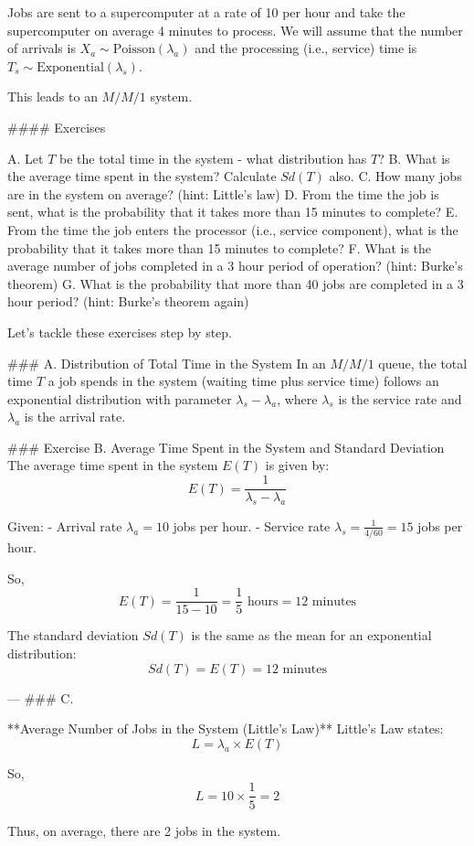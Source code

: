 


Jobs are sent to a supercomputer at a rate of 10 per hour and take the supercomputer on average 4 minutes to process. 
We will assume that the number of arrivals is $X_a \sim \text{Poisson}(\lambda_a)$ and the processing (i.e., service) time is $T_s \sim \text{Exponential}(\lambda_s)$. 

This leads to an $M/M/1$ system.

#### Exercises

A. Let $T$ be the total time in the system - what distribution has $T$? 
B. What is the average time spent in the system? Calculate $Sd(T)$ also.
C. How many jobs are in the system on average? (hint: Little's law)  
D. From the time the job is sent, what is the probability that it takes more than 15 minutes to complete? 
E. From the time the job enters the processor (i.e., service component), what is the probability that it takes more than 15 minutes to complete? 
F. What is the average number of jobs completed in a 3 hour period of operation? (hint: Burke's theorem)
G. What is the probability that more than 40 jobs are completed in a 3 hour period? (hint: Burke's theorem again)


Let's tackle these exercises step by step.

### A. Distribution of Total Time in the System
In an $M/M/1$ queue, the total time $T$ a job spends in the system (waiting time plus service time) follows an exponential distribution with parameter $\lambda_s - \lambda_a$, where $\lambda_s$ is the service rate and $\lambda_a$ is the arrival rate.

### Exercise B. 
Average Time Spent in the System and Standard Deviation
The average time spent in the system $E(T)$ is given by:
$$E(T) = \frac{1}{\lambda_s - \lambda_a}$$

Given:
- Arrival rate $\lambda_a = 10$ jobs per hour.
- Service rate $\lambda_s = \frac{1}{4/60} = 15$ jobs per hour.

So,
$$E(T) = \frac{1}{15 - 10} = \frac{1}{5} \text{ hours} = 12 \text{ minutes}$$

The standard deviation $Sd(T)$ is the same as the mean for an exponential distribution:
$$Sd(T) = E(T) = 12 \text{ minutes}$$

---
### C. 

**Average Number of Jobs in the System (Little's Law)**
Little's Law states:
$$L = \lambda_a \times E(T)$$

So,
$$L = 10 \times \frac{1}{5} = 2$$

Thus, on average, there are 2 jobs in the system.

